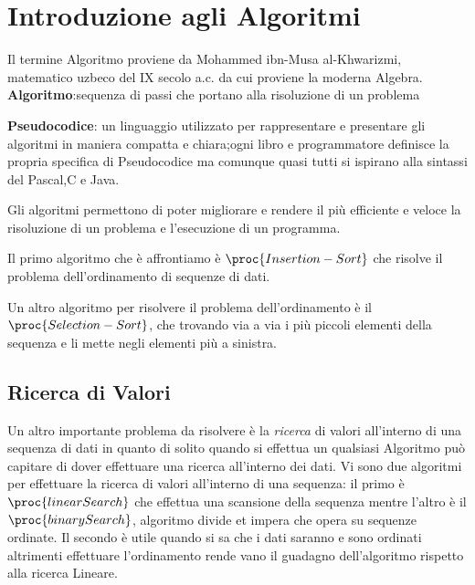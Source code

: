 \chapter{Introduzione agli Algoritmi}
Il termine Algoritmo proviene da Mohammed ibn-Musa al-Khwarizmi, matematico uzbeco
del IX secolo a.c. da cui proviene la moderna Algebra. \newline
\textbf{Algoritmo}:sequenza di passi che portano alla risoluzione di un problema

\textbf{Pseudocodice}: un linguaggio utilizzato per rappresentare e presentare gli algoritmi
 in maniera compatta e chiara;ogni libro e programmatore definisce la propria specifica
di Pseudocodice ma comunque quasi tutti si ispirano alla sintassi del Pascal,C e Java.

Gli algoritmi permettono di poter migliorare e rendere il più efficiente e veloce
la risoluzione di un problema e l'esecuzione di un programma.

Il primo algoritmo che è affrontiamo è $\proc{Insertion-Sort}$ che risolve il problema
dell'ordinamento di sequenze di dati.

Un altro algoritmo per risolvere il problema dell'ordinamento è il $\proc{Selection-Sort}$,
che trovando via a via i più piccoli elementi della sequenza e li mette negli elementi più a sinistra.

\section{Ricerca di Valori}
Un altro importante problema da risolvere è la \emph{ricerca} di valori all'interno
di una sequenza di dati in quanto di solito quando si effettua un qualsiasi Algoritmo
può capitare di dover effettuare una ricerca all'interno dei dati.
Vi sono due algoritmi per effettuare la ricerca di valori all'interno di una sequenza:
il primo è $\proc{linearSearch}$ che effettua una scansione della sequenza mentre
l'altro è il $\proc{binarySearch}$, algoritmo divide et impera che opera su sequenze ordinate.
Il secondo è utile quando si sa che i dati saranno e sono ordinati altrimenti effettuare
l'ordinamento rende vano il guadagno dell'algoritmo rispetto alla ricerca Lineare.



